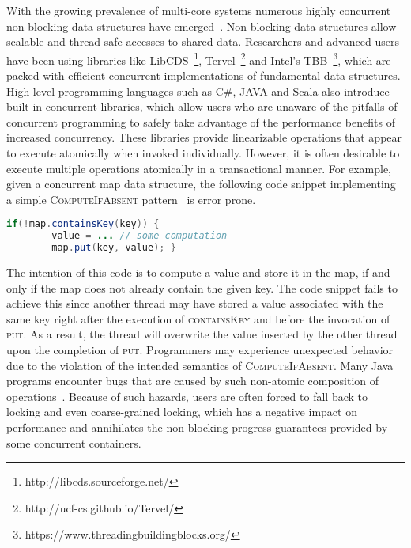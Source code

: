 With the growing prevalence of multi-core systems numerous highly concurrent non-blocking data structures have emerged~\cite{linden2013skiplist,ellen2010non,braginsky2012lock,zhang2015lockfree,michael2002high}.
Non-blocking data structures allow scalable and thread-safe accesses to shared data. 
Researchers and advanced users have been using libraries like LibCDS~\footnote{http://libcds.sourceforge.net/}, Tervel~\footnote{http://ucf-cs.github.io/Tervel/} and Intel's TBB~\footnote{https://www.threadingbuildingblocks.org/}, which are packed with efficient concurrent implementations of fundamental data structures.
High level programming languages such as C\#, JAVA and Scala also introduce built-in concurrent libraries, which allow users who are unaware of the pitfalls of concurrent programming to safely take advantage of the performance benefits of increased concurrency.
These libraries provide linearizable operations that appear to execute atomically when invoked individually.
However, it is often desirable to execute multiple operations atomically in a transactional manner.
For example, given a concurrent map data structure, the following code snippet implementing a simple \textsc{ComputeIfAbsent} pattern~\cite{golan2013concurrent} is error prone.
\begin{lstlisting}[basicstyle=\small,language=JAVA]
    if(!map.containsKey(key)) {
        value = ... // some computation
        map.put(key, value); }
\end{lstlisting}
The intention of this code is to compute a value and store it in the map, if and only if the map does not already contain the given key.
The code snippet fails to achieve this since another thread may have stored a value associated with the same key right after the execution of \textsc{containsKey} and before the invocation of \textsc{put}.
As a result, the thread will overwrite the value inserted by the other thread upon the completion of \textsc{put}.
Programmers may experience unexpected behavior due to the violation of the intended semantics of \textsc{ComputeIfAbsent}.
Many Java programs encounter bugs that are caused by such non-atomic composition of operations~\cite{shacham2011testing}.
Because of such hazards, users are often forced to fall back to locking and even coarse-grained locking, which has a negative impact on performance and annihilates the non-blocking progress guarantees provided by some concurrent containers.

